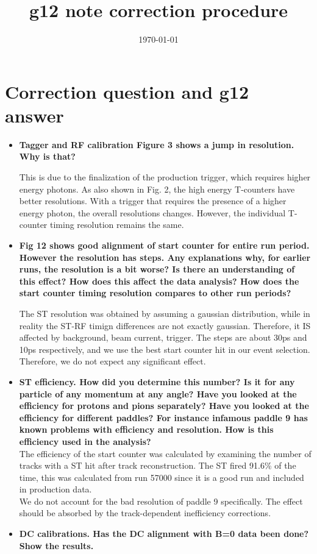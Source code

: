 \documentclass[ 12 pt]{article}
\title{g12 note correction procedure}
\date{\today}
\begin{document}
\section{Correction question and g12 answer}
\begin{itemize}
\item \textbf{Tagger and RF calibration Figure 3 shows a jump in resolution. Why is that?}


This is due to the finalization of the production trigger, which requires higher energy photons. As also shown in Fig. 2, the high energy T-counters have better resolutions. With a trigger that requires the presence of a higher energy photon, the overall resolutions changes. However, the individual T-counter timing resolution remains the same. 

\item \textbf{Fig 12 shows good alignment of start counter for entire run period. However the resolution has steps. Any explanations why, for earlier runs, the resolution is a bit worse? Is there an understanding of this effect? How does this affect the data analysis? How does the start counter timing resolution compares to other run periods?}

The ST resolution was obtained by assuming a gaussian distribution, while in reality the ST-RF timign differences are not exactly gaussian. Therefore, it IS affected by background, beam current, trigger. The steps are about 30ps and 10ps respectively, and we use the best start counter hit in our event selection. Therefore, we do not expect any significant effect.

\item \textbf{ST efficiency. How did you determine this number? Is it for any particle of any momentum at any angle? Have you looked at the efficiency for protons and pions separately? Have you looked at the efficiency for different paddles?
For instance infamous paddle 9 has known problems with efficiency and resolution. How is this efficiency used in the analysis?}\\
The efficiency of the start counter was calculated by examining the number of tracks with a ST hit after track reconstruction. The ST fired 91.6\% of the time, this was calculated from run 57000 since it is a good run and included in production data.\\ We do not account for the bad resolution of paddle 9 specifically. The effect should be absorbed by the track-dependent inefficiency corrections. 

\item \textbf{DC calibrations. Has the DC alignment with B=0 data been done? Show the results.}


\end{itemize}
\end{document}
